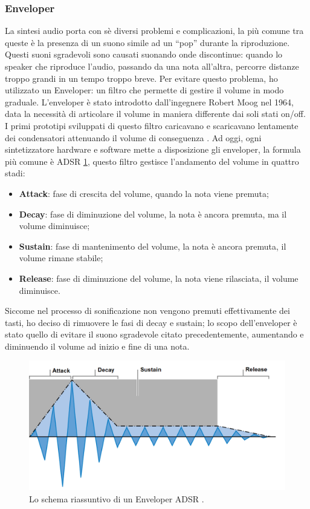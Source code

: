 \subsubsection{Enveloper}
La sintesi audio porta con sè diversi problemi e complicazioni, la più comune tra queste è la presenza di un suono simile ad un “pop” durante la riproduzione.
Questi suoni sgradevoli sono causati suonando onde discontinue: quando lo speaker che riproduce l'audio, passando da una nota all'altra, percorre distanze troppo grandi in un tempo troppo breve.
Per evitare questo problema, ho utilizzato un Enveloper: un filtro che permette di gestire il volume in modo graduale.
L'enveloper è stato introdotto dall'ingegnere Robert Moog nel 1964, data la necessità di articolare il volume in maniera differente dai soli stati on/off.
I primi prototipi sviluppati di questo filtro caricavano e scaricavano lentamente dei condensatori attenuando il volume di conseguenza \cite{enveloper}.
Ad oggi, ogni sintetizzatore hardware e software mette a disposizione gli enveloper, la formula più comune è ADSR \ref{fig:asdr}, questo filtro gestisce l'andamento del volume in quattro stadi:
\begin{itemize}
    \item \textbf{Attack}: fase di crescita del volume, quando la nota viene premuta;
    \item \textbf{Decay}: fase di diminuzione del volume, la nota è ancora premuta, ma il volume diminuisce;
    \item \textbf{Sustain}: fase di mantenimento del volume, la nota è ancora premuta, il volume rimane stabile;
    \item \textbf{Release}: fase di diminuzione del volume, la nota viene rilasciata, il volume diminuisce.  
\end{itemize}
Siccome nel processo di sonificazione non vengono premuti effettivamente dei tasti, ho deciso di rimuovere le fasi di decay e sustain;
lo scopo dell'enveloper è stato quello di evitare il suono sgradevole citato precedentemente, aumentando e diminuendo il volume ad inizio e fine di una nota.
\begin{figure}[H]
    \includegraphics[width=\linewidth,scale=0.2]{img/adsr.PNG}
    \caption{Lo schema riassuntivo di un Enveloper ADSR \cite{env_img}.}
    \label{fig:asdr}
\end{figure}

